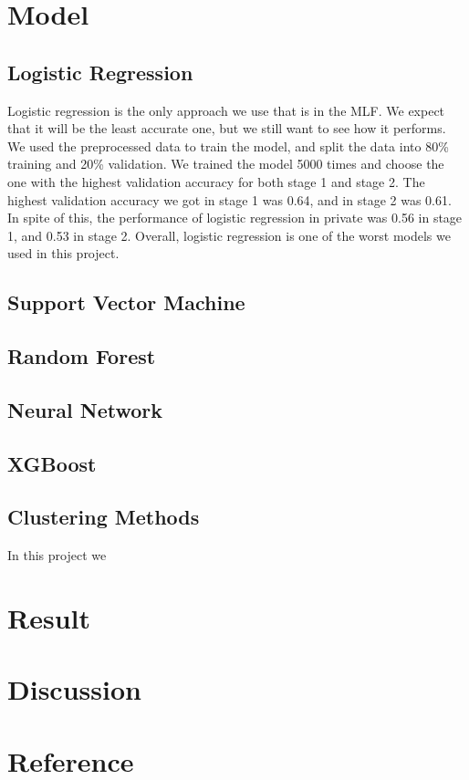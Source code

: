 \documentclass[12pt,a4paper]{article}
\begin{document}
\section{Model}

\subsection{Logistic Regression}

Logistic regression is the only approach we use that is in the MLF. We expect that it will be the least accurate one, but we still want to see how it performs. We used the preprocessed data to train the model, and split the data into 80\% training and 20\% validation. We trained the model 5000 times and choose the one with the highest validation accuracy for both stage 1 and stage 2. The highest validation accuracy we got in stage 1 was 0.64, and in stage 2 was 0.61. In spite of this, the performance of logistic regression in private was 0.56 in stage 1, and 0.53 in stage 2. Overall, logistic regression is one of the worst models we used in this project.

\subsection{Support Vector Machine}

\subsection{Random Forest}

\subsection{Neural Network}

\subsection{XGBoost}

\subsection{Clustering Methods}
In this project we 

\section{Result}

\section{Discussion}

\section{Reference}
\end{document}
